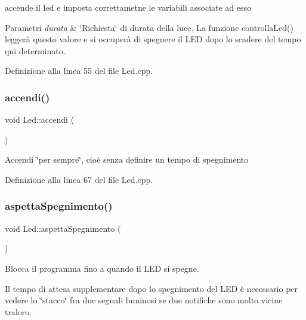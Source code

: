 accende il led e imposta correttametne le variabili associate ad esso 


\begin{DoxyParams}{Parametri}
{\em durata} & \char`\"{}\+Richiesta\char`\"{} di durata della luce. La funzione {\ttfamily controlla\+Led()} leggerà questo valore e si occuperà di spegnere il L\+ED dopo lo scadere del tempo qui determinato. \\
\hline
\end{DoxyParams}


Definizione alla linea 55 del file Led.\+cpp.

\mbox{\label{class_led_aeb8ef9393b6894e5fa78d2534e7a5b5e}} 
\subsubsection{\texorpdfstring{accendi()}{accendi()}\hspace{0.1cm}{\footnotesize\ttfamily [2/2]}}
{\footnotesize\ttfamily void Led\+::accendi (\begin{DoxyParamCaption}{ }\end{DoxyParamCaption})}

Accendi \char`\"{}per sempre\char`\"{}, cioè senza definire un tempo di spegnimento 

Definizione alla linea 67 del file Led.\+cpp.

\mbox{\label{class_led_ab7bd0e357df0672c48ad791be7785442}} 
\subsubsection{\texorpdfstring{aspetta\+Spegnimento()}{aspettaSpegnimento()}}
{\footnotesize\ttfamily void Led\+::aspetta\+Spegnimento (\begin{DoxyParamCaption}{ }\end{DoxyParamCaption})}



Blocca il programma fino a quando il L\+ED si spegne. 

Il tempo di attesa supplementare dopo lo spegnimento del L\+ED è necessario per vedere lo \char`\"{}stacco\char`\"{} fra due segnali luminosi se due notifiche sono molto vicine traloro. 


